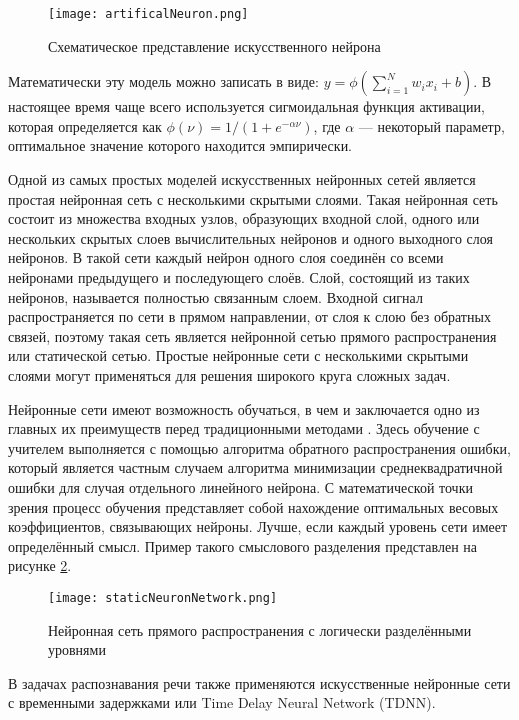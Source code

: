 \begin{figure}[h]
	\centering
	\texttt{[image: artificalNeuron.png]}
	\caption{Схематическое представление искусственного нейрона}
	\label{fig:artificalNeuron}
\end{figure}

Математически эту модель можно записать в виде: $y = \phi( \sum_{i=1}^N w_i x_i + b)$.
В настоящее время чаще всего используется сигмоидальная функция активации, которая определяется как $\phi(\nu) = 1 / (1 + e^{-\alpha \nu})$, где $\alpha$ --- некоторый параметр, оптимальное значение которого находится эмпирически.

Одной из самых простых моделей искусственных нейронных сетей является простая нейронная сеть с несколькими скрытыми слоями.
Такая нейронная сеть состоит из множества входных узлов, образующих входной слой, одного или нескольких скрытых слоев вычислительных нейронов и одного выходного слоя нейронов.
В такой сети каждый нейрон одного слоя соединён со всеми нейронами предыдущего и последующего слоёв.
Слой, состоящий из таких нейронов, называется полностью связанным слоем.
Входной сигнал распространяется по сети в прямом направлении, от слоя к слою без обратных связей, поэтому такая сеть является нейронной сетью прямого распространения или статической сетью.
Простые нейронные сети с несколькими скрытыми слоями могут применяться для решения широкого круга сложных задач.

Нейронные сети имеют возможность обучаться, в чем и заключается одно из главных их преимуществ перед традиционными методами \cite{nikolenko2017}.
Здесь обучение с учителем выполняется с помощью алгоритма обратного распространения ошибки, который является частным случаем алгоритма минимизации среднеквадратичной ошибки для случая отдельного линейного нейрона.
С математической точки зрения процесс обучения представляет собой нахождение оптимальных весовых коэффициентов, связывающих нейроны.
Лучше, если каждый уровень сети имеет определённый смысл.
Пример такого смыслового разделения представлен на рисунке \ref{fig:staticNeuronNetwork}.

\begin{figure}[h]
	\centering
	\texttt{[image: staticNeuronNetwork.png]}
	\caption{Нейронная сеть прямого распространения с логически разделёнными уровнями}
	\label{fig:staticNeuronNetwork}
\end{figure}

В задачах распознавания речи также применяются искусственные нейронные сети с временными задержками или Time Delay Neural Network (TDNN).

